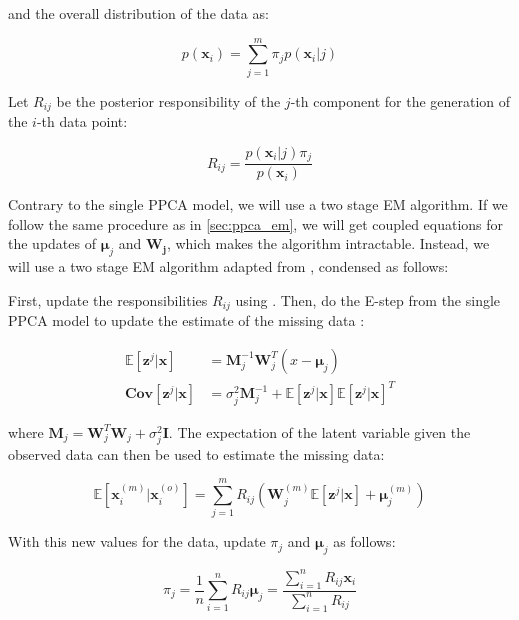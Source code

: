 \documentclass{article}
\newcommand{\E}{\mathbb{E}}
\begin{document}
\noindent and the overall distribution of the data as:

\begin{equation}
    \label{eq:mppca_EM_marginal}
    p(\mathbf{x}_i) = \sum_{j=1}^m \pi_j p(\mathbf{x}_i | j)
\end{equation}

Let $R_{ij}$ be the posterior responsibility of the $j$-th component for the generation of the $i$-th data point:

\begin{equation}
    \label{eq:mppca_EM_responsibility}
    R_{ij} = \frac{p(\mathbf{x}_i | j) \pi_j}{p(\mathbf{x}_i)}
\end{equation}

Contrary to the single PPCA model, we will use a two stage EM algorithm. If we follow the same procedure as in \cref{sec:ppca_em}, we will get coupled equations for the updates of $\boldsymbol{\mu}_j$ and $\mathbf{W_j}$, which makes the algorithm intractable. Instead, we will use a two stage EM algorithm adapted from \citet{MPPCA}, condensed as follows:

First, update the responsibilities $R_{ij}$ using . Then, do the E-step from the single PPCA model to update the estimate of the missing data :

\begin{align}
    \label{eq:mppca_EM_e_step_E}
    \E[\mathbf{z}^j|\mathbf{x}] &= \mathbf{M}_j^{-1}\mathbf{W}_j^{T}\left(x - \boldsymbol{\mu}_j\right) \\
    \label{eq:mppca_EM_e_step_Cov}
    \mathbf{Cov}[\mathbf{z}^j|\mathbf{x}] &= \sigma_j^2\mathbf{M}_j^{-1} + \E[\mathbf{z}^j|\mathbf{x}]\E[\mathbf{z}^j|\mathbf{x}]^T
\end{align}
    
\noindent where $\mathbf{M}_j = \mathbf{W}_j^{T}\mathbf{W}_j + \sigma_j^2\mathbf{I}$. The expectation of the latent variable given the observed data can then be used to estimate the missing data:

\begin{equation}
    \label{eq:mppca_EM_e_step_completion}
    \E[\mathbf{x}_i^{(m)}|\mathbf{x}_i^{(o)}] = \sum_{j=1}^m R_{ij} \left( \mathbf{W}_j^{(m)}\E[\mathbf{z}^j|\mathbf{x}] + \boldsymbol{\mu}_j^{(m)} \right)
\end{equation}

\noindent With this new values for the data, update $\pi_j$ and $\boldsymbol{\mu}_j$ as follows:

\begin{equation}
    \label{eq:mppca_EM_pi}
    \pi_j = \frac{1}{n}\sum_{i=1}^n R_{ij}
    \label{eq:mppca_EM_mu}
    \boldsymbol{\mu}_j = \frac{\sum_{i=1}^n R_{ij}\mathbf{x}_i}{\sum_{i=1}^n R_{ij}}
\end{equation}
\end{document}
